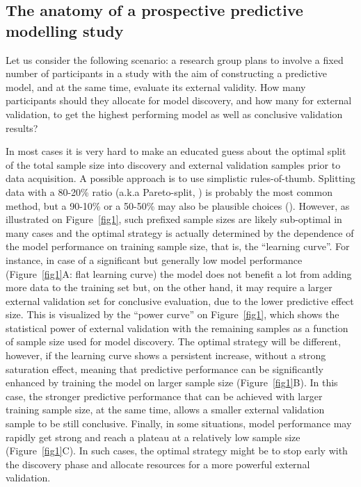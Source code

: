 \documentclass{article}
\begin{document}
\subsection{The anatomy of a prospective predictive modelling study}

Let us consider the following scenario: a research group plans to involve a fixed number of participants in a study with the aim of constructing a predictive model, and at the same time, evaluate its external validity. How many participants should they allocate for model discovery, and how many for external validation, to get the highest performing model as well as conclusive validation results?

In most cases it is very hard to make an educated guess about the optimal split of the total sample size into discovery and external validation samples prior to data acquisition. A possible approach is to use simplistic rules-of-thumb. Splitting data with a 80-20\% ratio (a.k.a Pareto-split, \cite{Lipovetsky_2009}) is probably the most common method, but a 90-10\% or a  50-50\% may also be plausible choices (\cite{Raykar_2015}). However, as illustrated on Figure~\ref{fig1}, such prefixed sample sizes are likely sub-optimal in many cases and the optimal strategy is actually determined by the dependence of the model performance on training sample size, that is, the ``learning curve''. For instance, in case of a significant but generally low model performance (Figure~\ref{fig1}A: flat learning curve) the model does not benefit a lot from adding more data to the training set but, on the other hand, it may require a larger external validation set for conclusive evaluation, due to the lower predictive effect size. This is visualized by the ``power curve'' on Figure~\ref{fig1}, which shows the statistical power of external validation with the remaining samples as a function of sample size used for model discovery. The optimal strategy will be different, however, if the learning curve shows a persistent increase, without a strong saturation effect, meaning that predictive performance can be significantly enhanced by training the model on larger sample size (Figure~\ref{fig1}B).
In this case, the stronger predictive performance that can be achieved with larger training sample size, at the same time, allows a smaller external validation sample to be still conclusive.
Finally, in some situations, model performance may rapidly get strong and reach a plateau at a relatively low sample size (Figure~\ref{fig1}C). In such cases, the optimal strategy might be to stop early with the discovery phase and allocate resources for a more powerful external validation.
\end{document}
